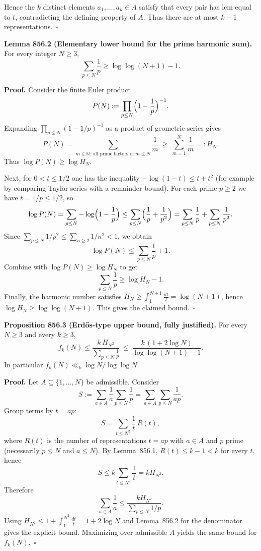 Hence the $k$ distinct elements $a_1,\dots,a_k\in A$ satisfy that every pair has lcm equal to $t$, contradicting the defining property of $A$. Thus there are at most $k-1$ representations.\ $\square$

\medskip
\textbf{Lemma 856.2 (Elementary lower bound for the prime harmonic sum).}
For every integer $N\ge 3$,
\[
  \sum_{p\le N}\frac{1}{p} \ge \log\log(N+1)-1.
\]

\textbf{Proof.}
Consider the finite Euler product
\[
  P(N):=\prod_{p\le N}\Bigl(1-\frac{1}{p}\Bigr)^{-1}.
\]
Expanding $\prod_{p\le N}(1-1/p)^{-1}$ as a product of geometric series gives
\[
  P(N)=\sum_{m\in\mathbb{N}:\ \text{all prime factors of }m\le N} \frac{1}{m} \ \ge\ \sum_{m=1}^{N} \frac{1}{m}=:H_N.
\]
Thus $\log P(N)\ge \log H_N$.

Next, for $0<t\le 1/2$ one has the inequality $-\log(1-t)\le t+t^2$ (for example by comparing Taylor series with a remainder bound). For each prime $p\ge 2$ we have $t=1/p\le 1/2$, so
\[
  \log P(N)=\sum_{p\le N} -\log\Bigl(1-\frac{1}{p}\Bigr)
  \le \sum_{p\le N}\Bigl(\frac{1}{p}+\frac{1}{p^2}\Bigr)
  = \sum_{p\le N}\frac{1}{p} + \sum_{p\le N}\frac{1}{p^2}.
\]
Since $\sum_{p\le N} 1/p^2 \le \sum_{n\ge 2} 1/n^2 < 1$, we obtain
\[
  \log P(N) \le \sum_{p\le N}\frac{1}{p} + 1.
\]
Combine with $\log P(N)\ge \log H_N$ to get
\[
  \sum_{p\le N}\frac{1}{p} \ge \log H_N - 1.
\]
Finally, the harmonic number satisfies $H_N\ge \int_1^{N+1}\frac{dt}{t}=\log(N+1)$, hence $\log H_N\ge \log\log(N+1)$. This gives the claimed bound.\ $\square$

\medskip
\textbf{Proposition 856.3 (Erd\H{o}s-type upper bound, fully justified).}
For every $N\ge 3$ and every $k\ge 3$,
\[
  f_k(N) \le \frac{k\,H_{N^2}}{\sum_{p\le N} \frac{1}{p}}
  \ \le\ \frac{k\,(1+2\log N)}{\log\log(N+1)-1}.
\]
In particular $f_k(N)\ll_k \log N/\log\log N$.

\textbf{Proof.}
Let $A\subseteq\{1,\dots,N\}$ be admissible. Consider
\[
  S := \sum_{a\in A}\frac{1}{a}\sum_{p\le N}\frac{1}{p}
  =\sum_{a\in A}\sum_{p\le N}\frac{1}{ap}.
\]
Group terms by $t=ap$:
\[
  S = \sum_{t\le N^2} \frac{1}{t}\,R(t),
\]
where $R(t)$ is the number of representations $t=ap$ with $a\in A$ and $p$ prime (necessarily $p\le N$ and $a\le N$). By Lemma~856.1, $R(t)\le k-1<k$ for every $t$, hence
\[
  S \le k\sum_{t\le N^2}\frac{1}{t} = k H_{N^2}.
\]
Therefore
\[
  \sum_{a\in A}\frac{1}{a} \le \frac{kH_{N^2}}{\sum_{p\le N} 1/p}.
\]
Using $H_{N^2}\le 1+\int_1^{N^2} \frac{dt}{t}=1+2\log N$ and Lemma~856.2 for the denominator gives the explicit bound.
Maximizing over admissible $A$ yields the same bound for $f_k(N)$.\ $\square$

